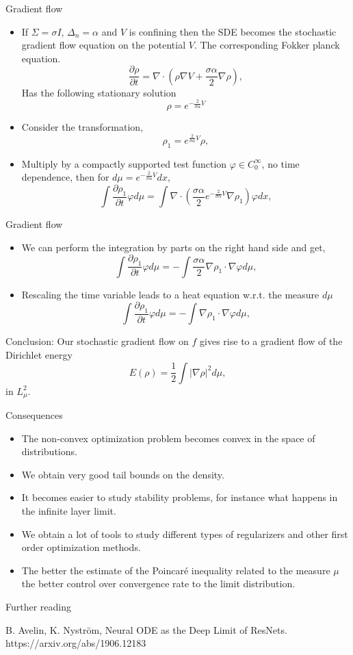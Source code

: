 \documentclass[10pt,handout]{beamer}
\renewcommand{\phi}{\varphi}
\begin{document}
\begin{frame}[t]{Gradient flow}
\begin{itemize}
	\item If $\Sigma = \sigma I$, $\Delta_n = \alpha$ and $V$ is confining then the SDE becomes the stochastic gradient flow equation on the potential $V$. The corresponding Fokker planck equation.
	$$
	    \frac{\partial \rho}{\partial t} = \nabla \cdot \left (\rho \nabla V + \frac{\sigma \alpha}{2}\nabla \rho \right ),
	$$
	Has the following stationary solution $$\rho = e^{-\frac{2}{\sigma \alpha} V}$$
	\item Consider the transformation,
	$$\rho_1 = e^{\frac{2}{\sigma \alpha} V } \rho,$$ 
	\item Multiply by a compactly supported test function $\phi \in C_0^\infty$, no time dependence, then for $d \mu = e^{-\frac{2}{\sigma \alpha} V} dx$,
	$$
	    \int \frac{\partial \rho_1}{\partial t} \phi d \mu = \int \nabla \cdot \left ( \frac{\sigma \alpha}{2} e^{-\frac{2}{\sigma \alpha} V } \nabla \rho_1 \right ) \phi dx,
	$$
\end{itemize}
\end{frame}
\begin{frame}[t]{Gradient flow}
	\begin{itemize}
		\item We can perform the integration by parts on the right hand side and get,
		$$
		    \int \frac{\partial \rho_1}{\partial t} \phi d \mu = - \int \frac{\sigma \alpha}{2} \nabla \rho_1 \cdot \nabla \phi d \mu,
		$$
		\item Rescaling the time variable leads to a heat equation w.r.t. the measure $d \mu$
		$$
		    \int \frac{\partial \rho_1}{\partial t} \phi d \mu = - \int \nabla \rho_1 \cdot \nabla \phi d \mu,
		$$
	\end{itemize}
	Conclusion:
	Our stochastic gradient flow on $f$ gives rise to a gradient flow of the Dirichlet energy
	$$
	    E(\rho) = \frac{1}{2} \int |\nabla \rho|^2 d\mu,
	$$
	in $L^2_\mu$.
\end{frame}
\begin{frame}[t]{Consequences}
	\begin{itemize}
		\item The non-convex optimization problem becomes convex in the space of distributions.
		\item We obtain very good tail bounds on the density.
		\item It becomes easier to study stability problems, for instance what happens in the infinite layer limit.
		\item We obtain a lot of tools to study different types of regularizers and other first order optimization methods.
		\item The better the estimate of the Poincaré inequality related to the measure $\mu$ the better control over convergence rate to the limit distribution.
	\end{itemize}
\end{frame}

\begin{frame}{Further reading} %
	\begin{thebibliography}{HKM06}
		\footnotesize
		 B. Avelin, K. Nyström,
		\newblock Neural ODE as the Deep Limit of ResNets. https://arxiv.org/abs/1906.12183
	\end{thebibliography}
\end{frame}
\end{document}
